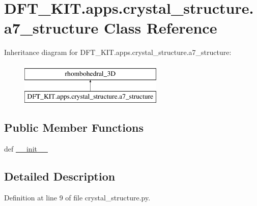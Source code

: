 \hypertarget{class_d_f_t___k_i_t_1_1apps_1_1crystal__structure_1_1a7__structure}{\section{D\+F\+T\+\_\+\+K\+I\+T.\+apps.\+crystal\+\_\+structure.\+a7\+\_\+structure Class Reference}
\label{class_d_f_t___k_i_t_1_1apps_1_1crystal__structure_1_1a7__structure}
}
Inheritance diagram for D\+F\+T\+\_\+\+K\+I\+T.\+apps.\+crystal\+\_\+structure.\+a7\+\_\+structure\+:\begin{figure}[H]
\begin{center}
\leavevmode
\includegraphics[height=2.000000cm]{class_d_f_t___k_i_t_1_1apps_1_1crystal__structure_1_1a7__structure}
\end{center}
\end{figure}
\subsection*{Public Member Functions}
\begin{DoxyCompactItemize}
\item 
def \hyperlink{class_d_f_t___k_i_t_1_1apps_1_1crystal__structure_1_1a7__structure_a26ee20d73969ab27dcc83e2969ce05ef}{\+\_\+\+\_\+init\+\_\+\+\_\+}
\end{DoxyCompactItemize}


\subsection{Detailed Description}


Definition at line 9 of file crystal\+\_\+structure.\+py.



